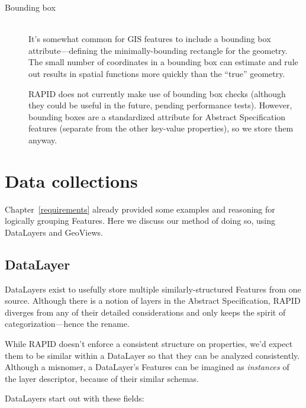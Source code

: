 \begin{description}
\item[Bounding box] \hfill \\
  It's somewhat common for GIS features to include a bounding box attribute---defining the minimally-bounding rectangle for the geometry. The small number of coordinates in a bounding box can estimate and rule out results in spatial functions more quickly than the ``true'' geometry.

  RAPID does not currently make use of bounding box checks (although they could be useful in the future, pending performance tests). However, bounding boxes are a standardized attribute for Abstract Specification features (separate from the other key-value properties), so we store them anyway.
  
\end{description}

\section{Data collections}
Chapter~\ref{requirements} already provided some examples and reasoning for logically grouping Features. Here we discuss our method of doing so, using DataLayers and GeoViews.

\subsection{DataLayer}
DataLayers exist to usefully store multiple similarly-structured Features from one source. Although there is a notion of layers in the Abstract Specification, RAPID diverges from any of their detailed considerations and only keeps the spirit of categorization---hence the rename.

While RAPID doesn't enforce a consistent structure on properties, we'd expect them to be similar within a DataLayer so that they can be analyzed consistently. Although a misnomer, a DataLayer's Features can be imagined as \textit{instances} of the layer descriptor, because of their similar schemas.

DataLayers start out with these fields:

